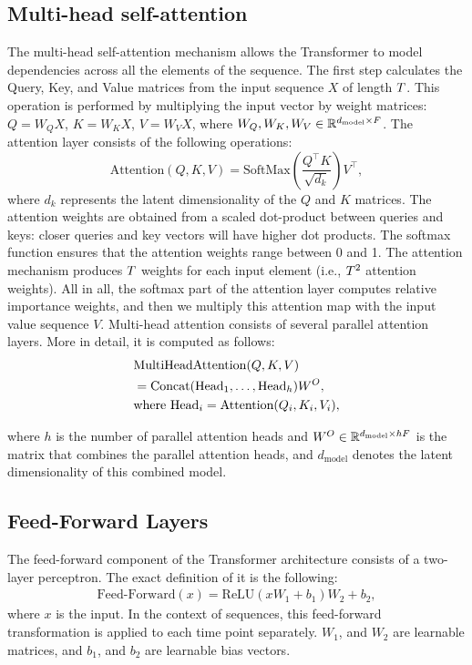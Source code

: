 \documentclass[lettersize,journal]{IEEEtran}
\begin{document}
\subsection{Multi-head self-attention}
The multi-head self-attention mechanism allows the Transformer to model dependencies across all the elements of the sequence. The first step calculates the Query, Key, and Value matrices from the input sequence $X$ of length $T$. This operation is performed by multiplying the input vector by weight matrices: $Q=W_QX$, $K=W_KX$, $V=W_VX$, where $W_Q, W_K, W_V \in \mathbb R^{d_\text{model} \times F }$. The attention layer consists of the following operations:
\begin{equation}
 \text{Attention}(Q, K, V) = \text{SoftMax}\left (\frac{Q^\top K}{\sqrt{d_k}} \right ) V^\top, 
\end{equation}
where $d_k$ represents the latent dimensionality of the $Q$ and $K$ matrices. The attention weights are obtained from a scaled dot-product between queries and keys: closer queries and key vectors will have higher dot products. The softmax function ensures that the attention weights range between 0 and 1. The attention mechanism produces $T$ weights for each input element  (i.e., $T^2$ attention weights). All in all, the softmax part of the attention layer computes relative importance weights, and then we multiply this attention map with the input value sequence $V$. 
Multi-head attention consists of several parallel attention layers. More in detail, it is computed as follows: 
\begin{align}
    &\text{MultiHeadAttention}(Q, K, V) \\
    &=\text{Concat}(\text{Head}_1, \dots, \text{Head}_h ) W^O, \notag \\
    &\text{where Head}_i = \text{Attention}(Q_i, K_i, V_i), \notag
\end{align}

where $h$ is the number of parallel attention heads and $W^O \in \mathbb R^{d_\text{model} \times h F }$ is the matrix that combines the parallel attention heads, and $d_\text{model}$ denotes the latent dimensionality of this combined model.




\subsection{Feed-Forward Layers}
The feed-forward component of the Transformer architecture consists of a two-layer perceptron. The exact definition of it is the following:
\begin{align}
    \text{Feed-Forward}(x) = \text{ReLU}(x W_1 + b_1) W_2 + b_2, 
\end{align}
where $x$ is the input. In the context of sequences, this feed-forward transformation is applied to each time point separately. $W_1$, and $W_2$ are learnable matrices, and $b_1$, and $b_2$ are learnable bias vectors.  
\end{document}
